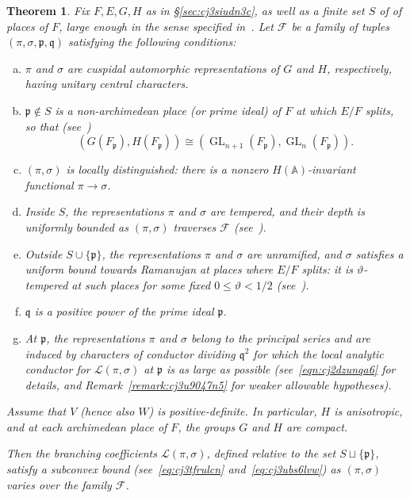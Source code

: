 \documentclass[reqno]{amsart}
\DeclareMathOperator{\GL}{GL}
\theoremstyle{plain} \newtheorem{theorem} {Theorem} \newtheorem{conjecture} {Conjecture} \newtheorem{corollary} [theorem] {Corollary} \newtheorem{proposition} [theorem] {Proposition} \newtheorem{fact} [theorem] {Fact}
\theoremstyle{definition} \newtheorem{definition} [theorem] {Definition}
\theoremstyle{itplain} %
\newcommand{\mfp}{\mathfrak{p}}
\begin{document}
\begin{theorem}\label{theorem:cj3ngw7u2s}
  Fix $F, E, G, H$ as in \S\ref{sec:cj3siudn3c}, as well as a finite set $S$ of of places of $F$, large enough in the sense specified in~\cite[\S3.6]{2020arXiv201202187N}.  Let $\mathcal{F}$ be a family of tuples $(\pi,\sigma, \mathfrak{p}, \mathfrak{q})$ satisfying the following conditions:
  \begin{enumerate}[(a)]
  \item $\pi$ and $\sigma$ are cuspidal automorphic representations of $G$ and $H$, respectively, having unitary central characters.
  \item $\mathfrak{p} \notin S$ is a non-archimedean place (or prime ideal) of $F$ at which $E/F$ splits, so that (see~\cite[\S3.3]{2020arXiv201202187N})
    \begin{equation*}
      (G(F_\mfp), H(F_\mfp)) \cong (\GL_{n+1}(F_\mfp), \GL_n(F_\mfp)).
    \end{equation*}
  \item $(\pi,\sigma)$ is locally distinguished: there is a nonzero $H(\mathbb{A})$-invariant functional $\pi \rightarrow \sigma$.
  \item Inside $S$, the representations $\pi$ and $\sigma$ are tempered, and their depth is uniformly bounded as $(\pi,\sigma)$ traverses $\mathcal{F}$ (see~\cite[\S1.3]{2020arXiv201202187N}).
  \item\label{itemize:cj3ubog35g} Outside $S \cup \{\mathfrak{p} \}$, the representations $\pi$ and $\sigma$ are unramified, and $\sigma$ satisfies a uniform bound towards Ramanujan at places where $E/F$ splits: it is $\vartheta$-tempered at such places for some fixed $0 \leq \vartheta < 1/2$ (see~\cite[\S5.2.1]{2020arXiv201202187N}).
  \item $\mathfrak{q}$ is a positive power of the prime ideal $\mathfrak{p}$.
  \item At $\mathfrak{p}$, the representations $\pi$ and $\sigma$ belong to the principal series and are induced by characters of conductor dividing $\mathfrak{q}^2$ for which the local analytic conductor for $\mathcal{L}(\pi,\sigma)$ at $\mathfrak{p}$ is as large as possible (see~\eqref{eqn:cj2dzunqa6} for details, and Remark~\ref{remark:cj3u9047n5} for weaker allowable hypotheses).
  \end{enumerate}
  Assume that $V$ (hence also $W$) is positive-definite.  In particular, $H$ is anisotropic, and at each archimedean place of $F$, the groups $G$ and $H$ are compact.

  Then the branching coefficients $\mathcal{L}(\pi,\sigma)$, defined relative to the set $S \sqcup \{\mathfrak{p} \}$, satisfy a subconvex bound (see~\eqref{eq:cj3tfrulcn} and~\eqref{eq:cj3ubs6lvw}) as $(\pi,\sigma)$ varies over the family $\mathcal{F}$.
\end{theorem}
\end{document}
